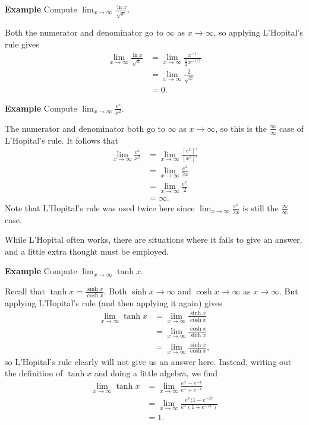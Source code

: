 \documentclass[twoside,openright,titlepage,a4paper]{book}
\begin{document}
\begin{sloppypar}
\textbf{Example} Compute $\displaystyle \lim_{x \rightarrow \infty} \frac{\ln x}{\sqrt{x}}$. 
\begin{examplebox}
Both the numerator and denominator go to $\infty$ as $x \rightarrow \infty$, so applying L'Hopital's rule gives
\begin{align*}
\lim_{x \rightarrow \infty} \frac{\ln x}{\sqrt{x}} &= \lim_{x \rightarrow \infty} \frac{x^{-1}}{\frac{1}{2}x^{-1/2}} \\
&= \lim_{x \rightarrow \infty} \frac{2}{\sqrt{x}} \\
&= 0.
\end{align*}
\end{examplebox}

\textbf{Example} Compute $\displaystyle \lim_{x \rightarrow \infty} \frac{e^{x}}{x^2}$.
\begin{examplebox}
The numerator and denominator both go to $\infty$ as $x \rightarrow \infty$, so this is the $\frac{\infty}{\infty}$ case of L'Hopital's rule. It follows that 
\begin{align*} 
\lim_{x\rightarrow \infty} \frac{e^x}{x^2} &= \lim_{x\rightarrow \infty} \frac{[e^x]'}{[x^2]'} \\
&= \lim_{x\rightarrow \infty} \frac{e^x}{2x} \\
&= \lim_{x \rightarrow \infty} \frac{e^x}{2} \\
&= \infty. 
\end{align*}
Note that L'Hopital's rule was used twice here since $\lim_{x\rightarrow \infty} \frac{e^x}{2x}$ is still the $\frac{\infty}{\infty}$ case.
\end{examplebox}

While L'Hopital often works, there are situations where it fails to give an answer, and a little extra thought must be employed.

\textbf{Example} Compute $\displaystyle \lim_{x \rightarrow \infty} \tanh x$. 
\begin{examplebox}
Recall that $\tanh x = \frac{\sinh x}{\cosh x}$. Both $\sinh x \rightarrow \infty$ and $\cosh x \rightarrow \infty$ as $x \rightarrow \infty$. But applying L'Hopital's rule (and then applying it again) gives
\begin{align*}
\lim_{x \rightarrow \infty} \tanh x &= \lim_{x \rightarrow \infty} \frac{\sinh x}{\cosh x} \\
&= \lim_{x \rightarrow \infty} \frac{\cosh x}{\sinh x} \\
&= \lim_{x \rightarrow \infty} \frac{\sinh x}{\cosh x}, 
\end{align*}
so L'Hopital's rule clearly will not give us an answer here. Instead, writing out the definition of $\tanh x$ and doing a little algebra, we find
\begin{align*}
\lim_{x \rightarrow \infty} \tanh x &= \lim_{x \rightarrow \infty} \frac{e^x - e^{-x}}{e^x + e^{-x}} \\
&= \lim_{x \rightarrow \infty} \frac{e^x(1 - e^{-2x}}{e^x(1 + e^{-2x})} \\
&= 1.
\end{align*}
\end{examplebox}


\end{sloppypar}
\end{document}
